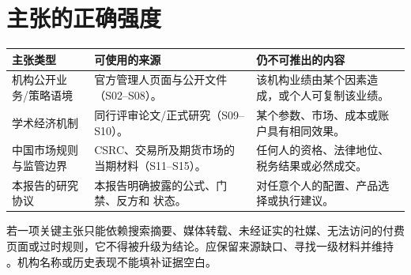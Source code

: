 \section{主张的正确强度}

\begin{tabularx}{\linewidth}{L{3.4cm}X X}
\toprule
\textbf{主张类型} & \textbf{可使用的来源} & \textbf{仍不可推出的内容} \\
\midrule
机构公开业务/策略语境 & 官方管理人页面与公开文件（S02--S08）。 & 该机构业绩由某个因素造成，或个人可复制该业绩。 \\
学术经济机制 & 同行评审论文/正式研究（S09--S10）。 & 某个参数、市场、成本或账户具有相同效果。 \\
中国市场规则与监管边界 & CSRC、交易所及期货市场的当期材料（S11--S15）。 & 任何人的资格、法律地位、税务结果或必然成交。 \\
本报告的研究协议 & 本报告明确披露的公式、门禁、反方和 \qzero{} 状态。 & 对任意个人的配置、产品选择或执行建议。 \\
\bottomrule
\end{tabularx}

\begin{sourcequalitybox}[来源不足时的处理]
若一项关键主张只能依赖搜索摘要、媒体转载、未经证实的社媒、无法访问的付费页面或过时规则，它不得被升级为结论。应保留来源缺口、寻找一级材料并维持 \qzero{}。机构名称或历史表现不能填补证据空白。
\end{sourcequalitybox}
